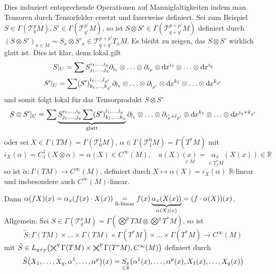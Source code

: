 Dies induziert entsprechende Operationen auf Mannigfaltigkeiten indem man Tensoren durch Tensorfelder ersetzt und faserweise definiert. Sei zum Beispiel $S\in \Gamma(\mathcal{T}_q^p M), S'\in \Gamma(\mathcal{T}_{q'}^{p'} M)$, so ist $S\otimes S' \in \Gamma(\mathcal{T}_{q+q'}^{p+p'} M)$ definiert durch $(S\otimes S')_{x\in M} = S_x\otimes S'_x \in \mathcal{T}_{q+q'}^{p+p'} T_x M$. Es bleibt zu zeigen, das $S\otimes S'$ wirklich glatt ist. Dies ist klar, denn lokal gilt 
\[S\vert_U = \sum S_{j_1,\ldots,j_q}^{i_1,\ldots,i_p} \partial_{i_1}\otimes \ldots \otimes \partial_{i_p} \otimes \mathrm{d}\mkern-1.0mu x^{i_1}\otimes \ldots \otimes \mathrm{d}\mkern-1.0mu x^{i_q}
\]
\[
S'\vert_U = \sum (S')_{k_1,\ldots,k_{q'}}^{l_1,\ldots,l_{p'}} \partial_{l_1}\otimes \ldots \otimes \partial_{l_{p'}} \otimes \mathrm{d}\mkern-1.0mu x^{k_1}\otimes \ldots \otimes \mathrm{d}\mkern-1.0mu x^{k_{q'}}
\]
und somit folgt lokal für das Tensorprodukt $S\otimes S'$
\[
S\otimes S'\vert_U = \sum \underbrace{S_{j_1,\ldots,j_q}^{i_1,\ldots,i_p} \sum (S')_{k_1,\ldots,k_q}^{l_1,\ldots,l_p}}_{\text{glatt}} \partial_{l_1}\otimes \ldots \otimes \partial_{i_p'+l_{p'}} \otimes \mathrm{d}\mkern-1.0mu x^{k_1}\otimes \ldots \otimes \mathrm{d}\mkern-1.0mu x^{j_q + k_{q'}}
\]
oder sei $X\in \Gamma(TM) = \Gamma(\mathcal{T}_0^1 M)$, $\alpha\in \Gamma(\mathcal{T}_1^0 M) = \Gamma(T^* M)$ mit 
\[
i_X(\alpha) = C_1^1(X\otimes \alpha) = \alpha(X) \in C^\infty (M),\quad a(X)\underset{\in M}{(x)} = \underset{\in T^*_x M}{\alpha_x}(X(x))\in \mathds{R}
\]
so ist $\tilde{\alpha}:\Gamma(TM) \to C^\infty(M)$, definiert durch $X\mapsto \alpha(X) = i_X(\alpha)$ $\mathds{R}$-linear und insbesondere auch $C^\infty (M)$-linear.
\begin{figure}[H]
\end{figure}
Dann $\alpha(fX)(x) = \alpha_x(f(x)\cdot X(x)) \underset{\mathbb{R}\text{-linear}}{=} f(x) \underbrace{\alpha_x(X(x))}_{\alpha(X)(x)} = (f\cdot \alpha(X))(x)$.\\
Allgemein: Sei $S\in \Gamma(\mathcal{T}_q^p M) = \Gamma(\bigotimes^p TM \otimes \bigotimes^q T^* M)$, so ist 
\[
\tilde{S}:\Gamma(TM)\times \ldots \times \Gamma(TM)\times \Gamma(T^* M)\times \ldots \times \Gamma(T^* M)\to C^\infty (M)
\]
mit $\tilde{S}\in L_{q+p}\enbrace*{\bigtimes^q \Gamma(TM)\times \bigtimes^p \Gamma(T^* M),C^\infty (M)}$ definiert durch
\[
\tilde{S}\enbrace*{X_1,\ldots,X_q,\alpha^1,\ldots, \alpha^p}(x) = \underset{\in \mathds{R}}{S_x}\enbrace*{\alpha^1(x),\ldots, \alpha^p(x), X_1(x),\ldots, X_q(x)}
\]

